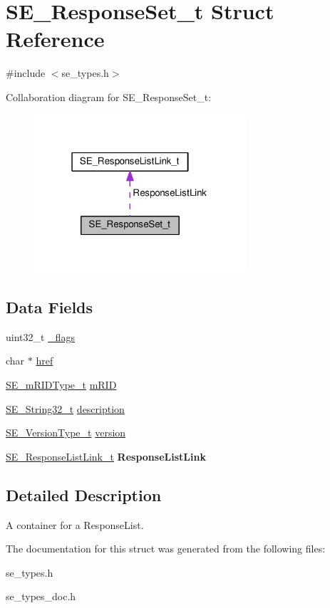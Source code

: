 \hypertarget{structSE__ResponseSet__t}{}\section{S\+E\+\_\+\+Response\+Set\+\_\+t Struct Reference}
\label{structSE__ResponseSet__t}


{\ttfamily \#include $<$se\+\_\+types.\+h$>$}



Collaboration diagram for S\+E\+\_\+\+Response\+Set\+\_\+t\+:\nopagebreak
\begin{figure}[H]
\begin{center}
\leavevmode
\includegraphics[width=223pt]{structSE__ResponseSet__t__coll__graph}
\end{center}
\end{figure}
\subsection*{Data Fields}
\begin{DoxyCompactItemize}
\item 
uint32\+\_\+t \hyperlink{group__ResponseSet_gab868eef3d41febb6b3e414b6c13a4f1b}{\+\_\+flags}
\item 
char $\ast$ \hyperlink{group__ResponseSet_gab8c5075bf443fd440f1a68ae0d6bd848}{href}
\item 
\hyperlink{group__mRIDType_gac74622112f3a388a2851b2289963ba5e}{S\+E\+\_\+m\+R\+I\+D\+Type\+\_\+t} \hyperlink{group__ResponseSet_ga1d199a43dbc543c9fb19c99aca6ef451}{m\+R\+ID}
\item 
\hyperlink{group__String32_gac9f59b06b168b4d2e0d45ed41699af42}{S\+E\+\_\+\+String32\+\_\+t} \hyperlink{group__ResponseSet_ga718d5e90f483d93f6a1928b98f4195c9}{description}
\item 
\hyperlink{group__VersionType_ga4b8d27838226948397ed99f67d46e2ae}{S\+E\+\_\+\+Version\+Type\+\_\+t} \hyperlink{group__ResponseSet_gaefb52ca508dcbeaba72f17886899d590}{version}
\item 
\hyperlink{structSE__ResponseListLink__t}{S\+E\+\_\+\+Response\+List\+Link\+\_\+t} {\bfseries Response\+List\+Link}
\end{DoxyCompactItemize}


\subsection{Detailed Description}
A container for a Response\+List. 

The documentation for this struct was generated from the following files\+:\begin{DoxyCompactItemize}
\item 
se\+\_\+types.\+h\item 
se\+\_\+types\+\_\+doc.\+h\end{DoxyCompactItemize}
